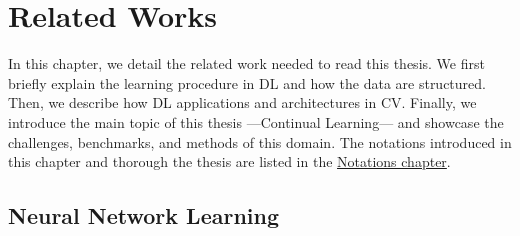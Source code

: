 \chapter{Related Works}
\label{chapter:related}


{}



In this chapter, we detail the related work needed to read this thesis. We first briefly
explain the learning procedure in \acf{DL} and how the data are structured. Then, we describe how
\ac{DL} applications and architectures in \acf{CV}. Finally, we introduce the main topic of this thesis
---Continual Learning--- and showcase the challenges, benchmarks, and methods of this domain. The
notations introduced in this chapter and thorough the thesis are listed in the
\hyperref[chap:notations]{Notations chapter}.

\section{Neural Network Learning}

